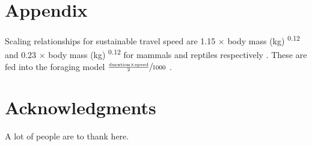 \documentclass[a4paper,12pt]{article}
\begin{document}

\section*{Appendix}
Scaling relationships for sustainable travel speed are 1.15 $\times$ body mass (kg) \textsuperscript{0.12} and 0.23 $\times$ body mass (kg) \textsuperscript{0.12} for mammals and reptiles respectively \citep{ruxton2004obligate}.
These are fed into the foraging model $\sfrac{\frac{\text{duration} \times \text{speed}}{2}}{1000}$ \citep{Enstipp2006Energetics}.

\section*{Acknowledgments}

A lot of people are to thank here.


\newpage



\end{document}
